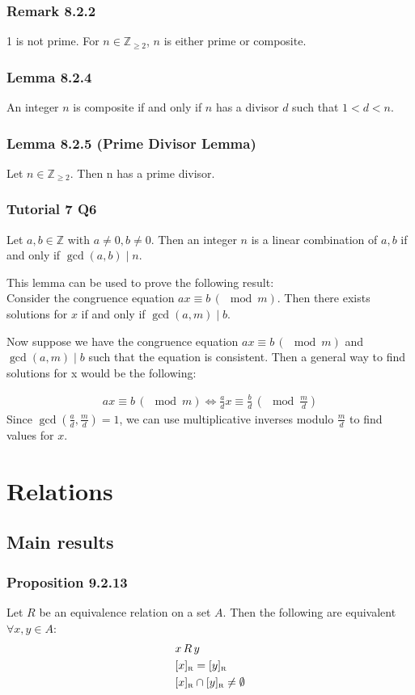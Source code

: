 \documentclass{article}
\begin{document}
\subsubsection{Remark 8.2.2}
1 is not prime.
For $n\in \mathbb{Z}_{\geq 2}$, $n$ is either prime or composite.

\subsubsection{Lemma 8.2.4}
An integer $n$ is composite if and only if $n$ has a divisor $d$ such that $1 < d < n$.

\subsubsection{Lemma 8.2.5 (Prime Divisor Lemma)} 
Let $n \in \mathbb{Z}_{\geq 2}$. Then n has a
prime divisor.


\subsubsection{Tutorial 7 Q6}
Let $a,b\in \mathbb{Z}$ with $a\neq 0,b\neq 0$. Then an integer $n$ is a linear combination of $a,b$ if and only if $\gcd(a,b)\mid n$.

This lemma can be used to prove the following result:\\
Consider the congruence equation $ax\equiv b\,(\mod m)$. Then there exists solutions for $x$ if and only if $\gcd(a,m)\mid b$.

Now suppose we have the congruence equation $ax\equiv b\,(\mod m)$ and $\gcd(a,m)\mid b$ such that the equation is consistent. Then a general way to find solutions for x would be the following:

\begin{align*}
    ax\equiv b\,(\mod m) \iff \frac{a}{d}x\equiv \frac{b}{d}\, (\mod \frac{m}{d})
\end{align*}
Since $\gcd(\frac{a}{d},\frac{m}{d})=1$, we can use multiplicative inverses modulo $\frac{m}{d}$ to find values for $x$.


\section{Relations}
\subsection{Main results}
\subsubsection{Proposition 9.2.13}
Let $R$ be an equivalence relation on a set $A$. Then the following are equivalent $\forall x,y\in A$:
\begin{align*}
    &x\, R\, y\\
    &[x]_\text{\tiny R} = [y]_\text{\tiny R}\\
    &[x]_\text{\tiny R}\cap [y]_\text{\tiny R}\neq \emptyset
\end{align*}
\end{document}
